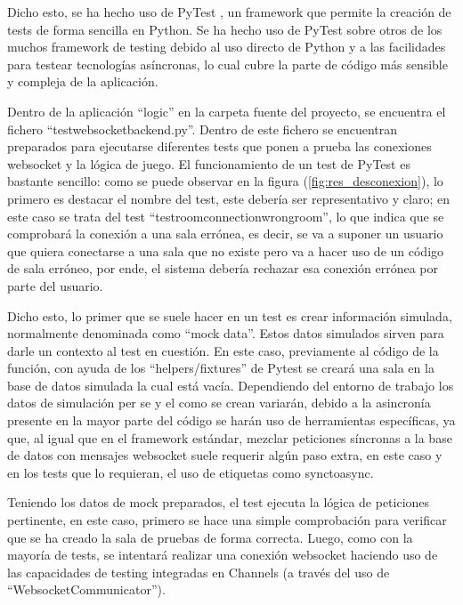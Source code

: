 Dicho esto, se ha hecho uso de PyTest \cite{pytest}, un framework que permite la creación de tests de forma sencilla en Python. Se ha hecho uso
de PyTest sobre otros de los muchos framework de testing debido al uso directo de Python y a las facilidades para testear 
tecnologías asíncronas, lo cual cubre la parte de código más sensible y compleja de la aplicación.

Dentro de la aplicación ``logic'' en la carpeta fuente del proyecto, se encuentra el fichero ``test\textunderscore websocket\textunderscore backend.py''. Dentro de este fichero
se encuentran preparados para ejecutarse diferentes tests que ponen a prueba las conexiones websocket y la lógica de juego. El funcionamiento de un test 
de PyTest es bastante sencillo: como se puede observar en la figura (\ref{fig:res_desconexion}), lo primero es destacar el nombre del test, este debería ser representativo y 
claro; en este caso se trata del test ``test\textunderscore room\textunderscore connection\textunderscore wrong\textunderscore room'', lo que indica que 
se comprobará la conexión a una sala errónea, es decir, se va a suponer un usuario que quiera conectarse a una sala que no existe pero va a hacer uso
de un código de sala erróneo, por ende, el sistema debería rechazar esa conexión errónea por parte del usuario.

Dicho esto, lo primer que se suele hacer en un test es crear información simulada, normalmente denominada como ``mock data''. Estos datos simulados
sirven para darle un contexto al test en cuestión. En este caso, previamente al código de la función, con ayuda de los ``helpers/fixtures'' de Pytest 
se creará una sala en la base de datos simulada la cual está vacía. Dependiendo del entorno de trabajo los datos de simulación per se y el como
se crean variarán, debido a la asincronía presente en la mayor parte del código se harán uso de herramientas específicas, ya que, al igual que 
en el framework estándar, mezclar peticiones síncronas a la base de datos con mensajes websocket suele requerir algún paso extra, en este caso y en los 
tests que lo requieran, el uso de etiquetas como sync\textunderscore to\textunderscore async.

Teniendo los datos de mock preparados, el test ejecuta la lógica de peticiones pertinente, en este caso, primero se hace
una simple comprobación para verificar que se ha creado la sala de pruebas de forma correcta. Luego, como con la mayoría de tests,
se intentará realizar una conexión websocket haciendo uso de las capacidades de testing integradas en Channels (a través del uso de ``WebsocketCommunicator'').

